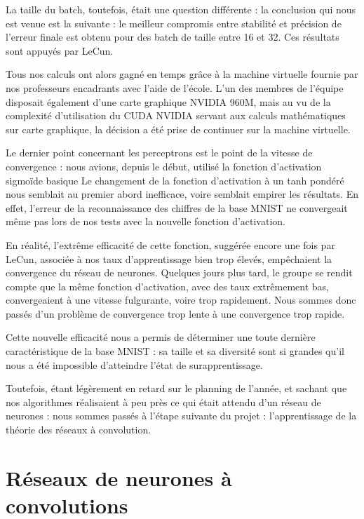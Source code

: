 \documentclass[
    10pt,
    a4paper,
    oneside,
    headinclude,footinclude,
    BCOR=5mm,
]{scrartcl}
\begin{document}
La taille du batch, toutefois, était une question différente : la conclusion qui nous est venue est la suivante : le meilleur compromis entre stabilité et
précision de l'erreur finale est obtenu pour des batch de taille entre 16 et 32. Ces résultats sont appuyés par LeCun. 

Tous nos calculs ont alors gagné en temps grâce à la machine virtuelle fournie par nos professeurs encadrants avec l'aide de l'école. L'un des membres de
l'équipe disposait également d'une carte graphique NVIDIA 960M, mais au vu de la complexité d'utilisation du CUDA NVIDIA servant aux calculs mathématiques
sur carte graphique, la décision a été prise de continuer sur la machine virtuelle.

Le dernier point concernant les perceptrons est le point de la vitesse de convergence : nous avions, depuis le début, utilisé la fonction d'activation
sigmoïde basique %
Le changement de la fonction d'activation à un tanh pondéré %
nous semblait au premier abord inefficace, voire semblait empirer les résultats. En effet, l'erreur de la reconnaissance des chiffres de la base MNIST ne
convergeait même pas lors de nos tests avec la nouvelle fonction d'activation. 

En réalité, l'extrême efficacité de cette fonction, suggérée encore une fois par LeCun, associée à nos taux d'apprentissage bien trop élevés, empêchaient
la convergence du réseau de neurones. Quelques jours plus tard, le groupe se rendit compte que la même fonction d'activation, avec des taux extrêmement
bas, convergeaient à une vitesse fulgurante, voire trop rapidement. Nous sommes donc passés d'un problème de convergence trop lente à une convergence trop
rapide. 

Cette nouvelle efficacité nous a permis de déterminer une toute dernière caractéristique de la base MNIST : sa taille et sa diversité sont si grandes qu'il
nous a été impossible d'atteindre l'état de surapprentissage.

Toutefois, étant légèrement en retard sur le planning de l'année, et sachant que nos algorithmes réalisaient à peu près ce qui était attendu d'un réseau
de neurones : nous sommes passés à l'étape suivante du projet : l'apprentissage de la théorie des réseaux à convolution.

\section{Réseaux de neurones à convolutions}
\end{document}
